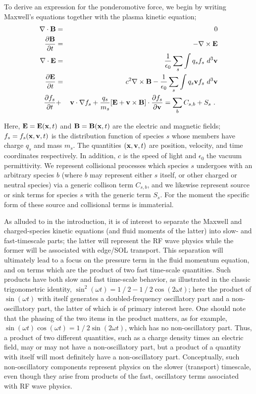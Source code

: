 To derive an expression for the ponderomotive force, 
we begin by writing Maxwell's equations together with the plasma kinetic equation;
\begin{eqnarray}
\nabla \cdot {\bf B} & = & 0 \\
{\partial {\bf B} \over \partial t} & = & - \nabla \times {\bf E} \\
\nabla \cdot {\bf E} & = & {1 \over \epsilon_{0}} \sum_{s} \int q_{s} f_{s}~d^{3}{\bf v} \\
{\partial {\bf E} \over \partial t} & = & c^{2} \nabla \times {\bf B} - {1 \over \epsilon_{0}} \sum_{s} 
\int q_{s} {\bf v} f_{s}~d^{3}{\bf v} \\
{\partial f_{s} \over \partial t} & + & {\bf v} \cdot \nabla f_{s} + {q_{s} \over m_{s}}
[{\bf E} + {\bf v} \times {\bf B}] \cdot {\partial f_{s} \over \partial {\bf v}} = 
\sum_{b} C_{s,b} + S_{s} ~.~
\end{eqnarray} 

Here, ${\bf E}={\bf E}({\bf x},t)$ and ${\bf B}={\bf B}({\bf x},t)$ are the electric and magnetic fields;
$f_{s}=f_{s}({\bf x},{\bf v},t)$ is the distribution function of species $s$ whose members have charge
$q_{s}$ and mass $m_{s}$.  The quantities $({\bf x}, {\bf v}, t)$ are position, velocity, and time coordinates
respectively.
In addition, $c$ is the speed of light and $\epsilon_{0}$ the vacuum permittivity.  We represent
collisional processes which species $s$ undergoes with an arbitrary species $b$ (where $b$ may represent
either $s$ itself, or other charged or neutral species) via a generic collison term $C_{s,b}$, and we likewise
represent source or sink terms for species $s$ with the generic term $S_{s}$.  For the moment the
specific form of these source and collisional terms is immaterial.

As alluded to in the introduction, it is of interest to separate the Maxwell and charged-species 
kinetic equations (and fluid moments of the latter) into slow- and fast-timescale parts; the latter
will represent the RF wave physics while the former will be associated with edge/SOL transport. 
This separation will 
ultimately lead to a focus on the pressure term in the fluid momentum equation, and on terms which 
are the product of two fast time-scale quantities. Such 
products have both slow and fast time-scale behavior, as illustrated in the classic trigonometric 
identity, $\sin^{2}(\omega t) = 1⁄2-1⁄2 \cos(2\omega t)$; here the product of $\sin(\omega t)$ with 
itself generates a 
doubled-frequency oscillatory part and a non-oscillatory part, the latter of which is of primary 
interest here. One should note that the phasing of the two items in the product matters, as for 
example, $\sin(\omega t) \cos(\omega t) = 1⁄2 \sin(2\omega t)$, which has no non-oscillatory part. Thus, a product of 
two different quantities, such as a charge density times an electric field, may or may not have a 
non-oscillatory part, but a product of a quantity with itself will most definitely have a 
non-oscillatory part.  Conceptually, such non-oscillatory components represent physics on the slower
(transport) timescale, even though they arise from products of the fast, oscillatory terms associated 
with RF wave physics.

